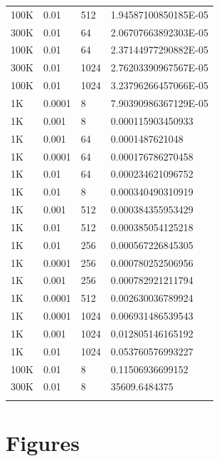 \begin{table}[H]
\begin{tabular}{llll}
100K     & 0.01  & 512  & 1.94587100850185E-05 \\ 
300K     & 0.01  & 64   & 2.06707663892303E-05 \\ 
100K     & 0.01  & 64   & 2.37144977290882E-05 \\ 
300K     & 0.01  & 1024  & 2.76203390967567E-05 \\ 
100K     & 0.01  & 1024  & 3.23796266457066E-05 \\ 
1K      & 0.0001 & 8    & 7.90390986367129E-05 \\ 
1K      & 0.001 & 8    & 0.000115903450933   \\ 
1K      & 0.001 & 64   & 0.0001487621048     \\ 
1K      & 0.0001 & 64   & 0.000176786270458   \\ 
1K      & 0.01  & 64   & 0.000234621096752   \\ 
1K      & 0.01  & 8    & 0.000340490310919   \\ 
1K      & 0.001 & 512  & 0.000384355953429   \\ 
1K      & 0.01  & 512  & 0.000385054125218   \\ 
1K      & 0.01  & 256  & 0.000567226845305   \\ 
1K      & 0.0001 & 256  & 0.000780252506956   \\ 
1K      & 0.001 & 256  & 0.000782921211794   \\ 
1K      & 0.0001 & 512  & 0.002630036789924   \\ 
1K      & 0.0001 & 1024  & 0.006931486539543   \\ 
1K      & 0.001 & 1024  & 0.012805146165192   \\ 
1K      & 0.01  & 1024  & 0.053760576993227   \\ 
100K     & 0.01  & 8    & 0.11506936699152    \\ 
300K                           & 0.01                        & 8                          & 35609.6484375                             \\
\bottomrule\\
\end{tabular}
\end{table}




\section{Figures}

